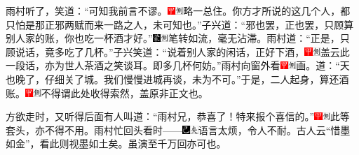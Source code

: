 {雨村听了，笑道：``可知我前言不谬。{\includegraphics[width=3mm]{../Images/00002}\includegraphics[width=3mm]{../Images/00011}\footnotesize \kaishu 略一总住。}你方才所说的这几个人，都只怕是那正邪两赋而来一路之人，未可知也。''子兴道：``邪也罢，正也罢，只顾算别人家的账，你也吃一杯酒才好。''{\includegraphics[width=3mm]{../Images/00006}\includegraphics[width=3mm]{../Images/00011}\footnotesize \kaishu 笔转如流，毫无沾滞。}雨村道：``正是，只顾说话，竟多吃了几杯。''子兴笑道：``说着别人家的闲话，正好下酒，{\includegraphics[width=3mm]{../Images/00002}\includegraphics[width=3mm]{../Images/00011}\footnotesize \kaishu 盖云此一段话，亦为世人茶酒之笑谈耳。}即多几杯何妨。''雨村向窗外看{\includegraphics[width=3mm]{../Images/00002}\includegraphics[width=3mm]{../Images/00011}\footnotesize \kaishu 画。}道：``天也晚了，仔细关了城。我们慢慢进城再谈，未为不可。''于是，二人起身，算还酒账。{\includegraphics[width=3mm]{../Images/00002}\includegraphics[width=3mm]{../Images/00011}\footnotesize \kaishu 不得谓此处收得索然，盖原非正文也。}

方欲走时，又听得后面有人叫道：``雨村兄，恭喜了！特来报个喜信的。''{\includegraphics[width=3mm]{../Images/00002}\includegraphics[width=3mm]{../Images/00011}\footnotesize \kaishu 此等套头，亦不得不用。}雨村忙回头看时------{\includegraphics[width=3mm]{../Images/00003}\includegraphics[width=3mm]{../Images/00012}\footnotesize \kaishu 语言太烦，令人不耐。古人云``惜墨如金''，看此则视墨如土矣。虽演至千万回亦可也。}

}
